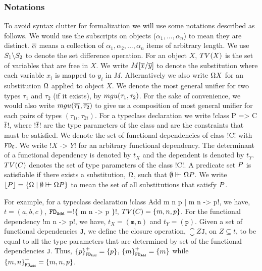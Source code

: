 \documentclass[format=acmsmall,manuscript,review,screen,nonacm,margin=1in,11pt]{acmart}
\begin{document}
\subsubsection {Notations}\label{subsubsec:fd-notations}
To avoid syntax clutter for formalization we will use some notations described as follows.
We would use the subscripts on objects ($\alpha_1,\ldots, \alpha_n$) to mean they are distinct.
$\overline{\alpha}$ means a collection of $\alpha_1, \alpha_2, ..., \alpha_n$ items of arbitrary length.
We use $S_1 \backslash S_2$ to denote the set difference operation. For an object $X$,
$TV(X)$ is the set of variables that are free in $X$.
We write $M[\overline{x}/\overline{y}]$ to denote the substitution where each variable
$x_i$ is mapped to $y_i$ in $M$. Alternatively we also
write $\Omega X$ for an substitution $\Omega$ applied to object $X$.
We denote the most general unifier for two types $\tau_1$ and $\tau_2$ (if it exists),
by $mgu(\tau_1,\tau_2)$\cite{robinson_machine-oriented_1965}. For the sake of convenience,
we would also write $mgu(\overline{\tau_1},\overline{\tau_2})$ to give us a composition of most general
unifier for each pairs of types $(\tau_{1i}, \tau_{2i})$.
For a typeclass declaration we write !class P => C $\overline{t}$!, where !$\overline{t}$! are the type parameters
of the class and \Preds{} are the constraints that must be satisfied.
We denote the set of functional dependencies of class !C! with $\texttt{FD}_\texttt{C}$.
We write !$X$ -> $Y$! for an arbitrary functional dependency.
The determinant of a functional dependency is denoted by $t_{X}$
and the dependent is denoted by  $t_{Y}$. $TV(C)$ denotes the set of type parameters
of the class !C!. A predicate set $P$ is satisfiable if there exists a substitution,
$\Omega$, such that $\emptyset\vdash\hspace{-0.7ex}\vdash \Omega P$.
We write $\lfloor P\rfloor = \{\Omega \mid \emptyset \vdash\hspace{-0.7ex}\vdash \Omega P\}$
to mean the set of all substitutions that satisfy $P$.

For example, for a typeclass declaration !class Add m n p | m n -> p!,
we have, $t = (a, b, c)$, $\texttt{FD}_\texttt{Add}=$!$\{$ m n -> p $\}$!, $TV(C) = \{m, n, p\}$.
For the functional dependency !m n -> p!, we have, $t_X = {(\texttt{m},\texttt{n})}$ and $t_Y = {(\texttt{p})}$.
Given a set of functional dependencies $\texttt{J}$, we define the closure operation,
$\closure Z {\texttt{J}}$, on $Z \subseteq t$, to be equal to all the type parameters
that are determined by set of the functional dependencies \texttt{J}.
Thus, ${\{p\}}^{+}_{\texttt{FD}_\texttt{Add}} = \{p\}$,
${\{m\}}^{+}_{\texttt{FD}_\texttt{Add}} = \{m\}$ while ${\{m, n\}}^{+}_{\texttt{FD}_\texttt{Add}} = \{m, n, p\}$.
\end{document}
